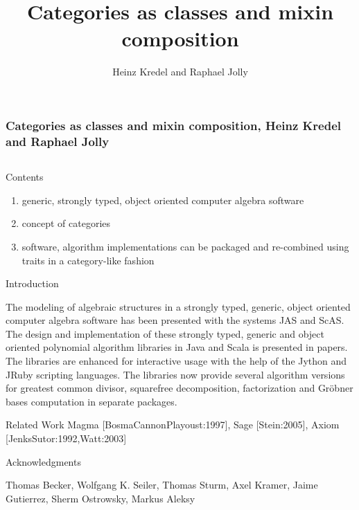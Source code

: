 \documentclass[final]{beamer}
\title[Categories and Mixins]{Categories as classes and mixin composition}
\author[Kredel \& Jolly]{Heinz Kredel\inst{1} and Raphael Jolly\inst{2}}
\institute{IT-Center, University of Mannheim, Germany %
\and Databeans, Paris, France%
}
\begin{document}

\begin{frame}[fragile] 
\frametitle{\hspace{13cm}Categories as classes and mixin composition, Heinz Kredel and Raphael Jolly}
\begin{columns}[t]

\begin{column}{.3\linewidth}

  \begin{block}{\large Contents}
  \normalsize 
  \begin{enumerate}
  \item generic, strongly typed, object oriented computer algebra software
  \item concept of categories 
  \item software, algorithm implementations can be packaged and
    re-combined using traits in a category-like fashion
  \end{enumerate}
  \end{block}
  \hfill
  \begin{block}{\large Introduction}
{\scriptsize
The modeling of algebraic structures in a strongly typed, generic,
object oriented computer algebra software has been presented with the
systems JAS and ScAS.
The design and implementation of these strongly typed, generic and
object oriented polynomial algorithm libraries in Java and Scala is
presented in papers.  
The libraries are enhanced for interactive usage with the help of the Jython and
JRuby scripting languages. The libraries now
provide several algorithm versions for greatest common divisor,
squarefree decomposition, factorization and Gr\"obner bases
computation in separate packages.
\par}\par
  \end{block}
  \hfill
  \begin{block}{\large Related Work}
\scriptsize
Magma [BosmaCannonPlayoust:1997], Sage [Stein:2005], 
Axiom [JenksSutor:1992,Watt:2003]
\par
{\scriptsize Acknowledgments}\par
{\tiny Thomas Becker, Wolfgang K. Seiler, Thomas Sturm, Axel Kramer, 
Jaime Gutierrez, Sherm Ostrowsky, Markus Aleksy\par}
  \end{block}

\end{column}
\end{columns}
\end{frame}
\end{document}
